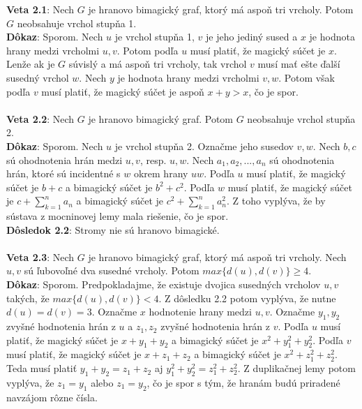 \documentclass[12pt]{article}
\begin{document}
\textbf{Veta 2.1}: Nech $G$ je hranovo bimagický graf, ktorý má aspoň tri vrcholy. Potom $G$ neobsahuje vrchol stupňa 1. \\

\textbf{Dôkaz}: Sporom. Nech $u$ je vrchol stupňa 1, $v$ je jeho jediný sused a $x$ je hodnota hrany medzi vrcholmi $u,v$. Potom podľa $u$ musí platiť, že magický súčet je $x$. Lenže ak je $G$ súvislý a má aspoň tri vrcholy, tak vrchol $v$ musí mať ešte ďalší susedný vrchol $w$. Nech $y$ je hodnota hrany medzi vrcholmi $v,w$. Potom však podľa $v$ musí platiť, že magický súčet je aspoň $x + y > x$, čo je spor. \\\\ 

\textbf{Veta 2.2}: Nech $G$ je hranovo bimagický graf. Potom $G$ neobsahuje vrchol stupňa 2. \\

\textbf{Dôkaz}: Sporom. Nech $u$ je vrchol stupňa 2. Označme jeho susedov $v,w$. Nech $b,c$ sú ohodnotenia hrán medzi $u,v$, resp. $u,w$. Nech $a_1, a_2, ... , a_n$ sú ohodnotenia hrán, ktoré sú incidentné s $w$ okrem hrany $uw$. Podľa $u$ musí platiť, že magický súčet je $b+c$ a bimagický súčet je $b^2 + c^2$. Podľa $w$ musí platiť, že magický súčet je $c + \sum_{k=1}^{n} a_n$ a bimagický súčet je $c^2 + \sum_{k=1}^{n} a^2_n$. Z toho vyplýva, že by sústava z mocninovej lemy mala riešenie, čo je spor. \\

\textbf{Dôsledok 2.2}: Stromy nie sú hranovo bimagické. \\\\

\textbf{Veta 2.3}: Nech $G$ je hranovo bimagický graf, ktorý má aspoň tri vrcholy. Nech $u,v$ sú ľubovoľné dva susedné vrcholy. Potom $max \{d(u), d(v)\} \geq 4$. \\

\textbf{Dôkaz}: Sporom. Predpokladajme, že existuje dvojica susedných vrcholov $u,v$ takých, že $max \{d(u), d(v)\} < 4$. Z dôsledku 2.2 potom vyplýva, že nutne $d(u) = d(v) = 3$. Označme $x$ hodnotenie hrany medzi $u,v$. Označme $y_1, y_2$ zvyšné hodnotenia hrán z $u$ a $z_1, z_2$ zvyšné hodnotenia hrán z $v$. Podľa $u$ musí platiť, že magický súčet je $x + y_1 + y_2$ a bimagický súčet je $x^2 + y^2_1 + y^2_2$. Podľa $v$ musí platiť, že magický súčet je $x + z_1 + z_2$ a bimagický súčet je $x^2 + z^2_1 + z^2_2$. Teda musí platiť $y_1 + y_2 = z_1 + z_2$ aj $y^2_1 + y^2_2 = z^2_1 + z^2_2$. Z duplikačnej lemy potom vyplýva, že $z_1 = y_1$ alebo $z_1 = y_2$, čo je spor s tým, že hranám budú priradené navzájom rôzne čísla.  \\
\end{document}
